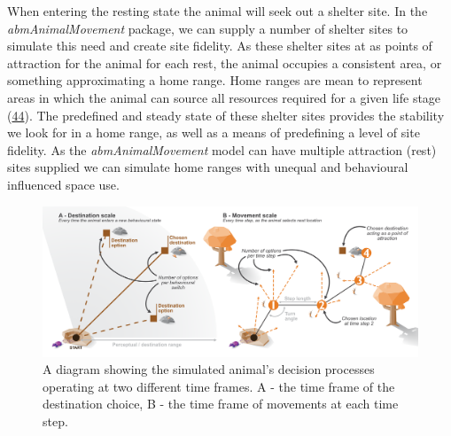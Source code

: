 \documentclass[10pt,a4paper]{article}
\begin{document}
When entering the resting state the animal will seek out a shelter site.
In the \emph{abmAnimalMovement} package, we can supply a number of shelter sites to simulate this need and create site fidelity.
As these shelter sites at as points of attraction for the animal for each rest, the animal occupies a consistent area, or something approximating a home range.
Home ranges are mean to represent areas in which the animal can source all resources required for a given life stage (\protect\hyperlink{ref-silva_autocorrelationinformed_2022}{44}).
The predefined and steady state of these shelter sites provides the stability we look for in a home range, as well as a means of predefining a level of site fidelity.
As the \emph{abmAnimalMovement} model can have multiple attraction (rest) sites supplied we can simulate home ranges with unequal and behavioural influenced space use.

\begin{figure}

{\centering \includegraphics[width=0.8\linewidth]{../ext_figures/Simulation Process Diagram Static} 

}

\caption{A diagram showing the simulated animal's decision processes operating at two different time frames. A - the time frame of the destination choice, B - the time frame of movements at each time step.}\label{fig:walkDiagram}
\end{figure}
\end{document}

